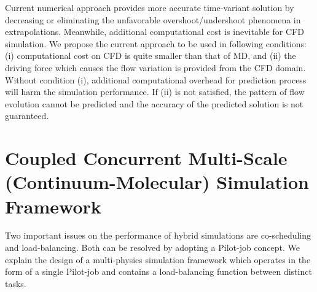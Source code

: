 \documentclass[preprint,12pt]{elsarticle}
\begin{document}


Current numerical approach provides more accurate time-variant solution by decreasing or eliminating the unfavorable overshoot/undershoot phenomena in extrapolations. Meanwhile, additional computational cost is inevitable for CFD simulation. We propose the current approach to be used in following conditions: (i) computational cost on CFD is quite smaller than that of MD, and (ii) the driving force which causes the flow variation is provided from the CFD domain. Without condition (i), additional computational overhead for prediction process will harm the simulation performance. If (ii) is not satisfied, the pattern of flow evolution cannot be predicted and the accuracy of the predicted solution is not guaranteed.



\section{Coupled Concurrent Multi-Scale (Continuum-Molecular) Simulation Framework}
\label{sec:computational}

Two important issues on the performance of hybrid simulations are co-scheduling and load-balancing. Both can be resolved by adopting a Pilot-job concept. We explain the design of a multi-physics simulation framework which operates in the form of a single Pilot-job and contains a load-balancing function between distinct tasks.
\end{document}
